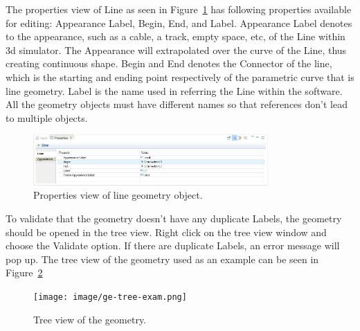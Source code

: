 The properties view of Line as seen in Figure~\ref{fig:ge-prop-line} has following properties available for editing: Appearance Label, Begin, End, and Label. Appearance Label denotes to the appearance, such as a cable, a track, empty space, etc, of the Line within 3d simulator. The Appearance will extrapolated over the curve of the Line, thus creating continuous shape. Begin and End denotes the Connector of the line, which is the starting and ending point respectively of the parametric curve that is line geometry. Label is the name used in referring the Line within the software. All the geometry objects must have different names so that references don't lead to multiple objects.

\begin{figure}[htp]
\begin{center}
  \includegraphics[width=0.8\textwidth]{image/ge-prop-line.png}
  \caption{Properties view of line geometry object.}
  \label{fig:ge-prop-line}
\end{center}
\end{figure}

To validate that the geometry doesn't have any duplicate Labels, the geometry should be opened in the tree view. Right click on the tree view window and choose the Validate option. If there are duplicate Labels, an error message will pop up. The tree view of the geometry used as an example can be seen in Figure~\ref{fig:ge-tree-exam}

\begin{figure}[htp]
\begin{center}
  \texttt{[image: image/ge-tree-exam.png]}
  \caption{Tree view of the geometry.}
  \label{fig:ge-tree-exam}
\end{center}
\end{figure}

